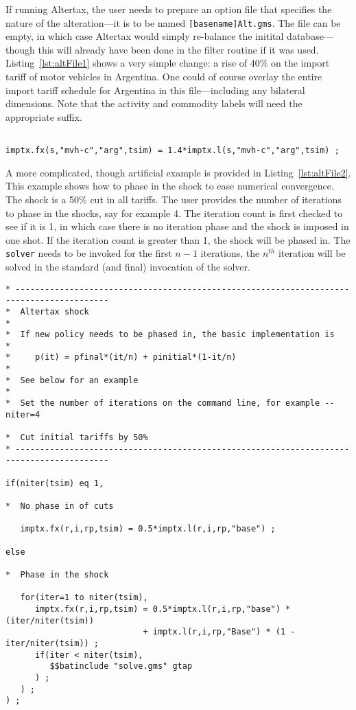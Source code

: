 If running Altertax, the user needs to prepare an option file that specifies the
nature of the alteration---it is to be named \texttt{[basename]Alt.gms}. The
file can be empty, in which case Altertax would simply re-balance the initital
database---though this will already have been done in the filter routine if it
was used. Listing~\ref{lst:altFile1} shows a very simple change: a rise of 40\%
on the import tariff of motor vehicles in Argentina. One could of course overlay
the entire import tariff schedule for Argentina in this file---including any
bilateral dimensions. Note that the activity and commodity labels will need the
appropriate suffix.

\begin{lstlisting}[language=GAMS,
   caption={An example of an Altertax shock}, label=lst:altFile1]

imptx.fx(s,"mvh-c","arg",tsim) = 1.4*imptx.l(s,"mvh-c","arg",tsim) ;

\end{lstlisting}

A more complicated, though artificial example is provided in
Listing~\ref{lst:altFile2}. This example shows how to phase in the shock to ease
numerical convergence. The shock is a 50\% cut in all tariffs. The user provides
the number of iterations to phase in the shocks, say for example 4. The
iteration count is first checked to see if it is 1, in which case there is no
iteration phase and the shock is imposed in one shot. If the iteration count is
greater than 1, the shock will be phased in. The \texttt{solver} needs to be
invoked for the first $n-1$ iterations, the $n^{\mathit{th}}$ iteration will be
solved in the standard (and final) invocation of the solver.

\begin{lstlisting}[language=GAMS,
   caption={An example of an Altertax file}, label=lst:altFile2]
* -----------------------------------------------------------------------------------------
*  Altertax shock
*
*  If new policy needs to be phased in, the basic implementation is
*
*     p(it) = pfinal*(it/n) + pinitial*(1-it/n)
*
*  See below for an example
*
*  Set the number of iterations on the command line, for example --niter=4

*  Cut initial tariffs by 50%
* -----------------------------------------------------------------------------------------

if(niter(tsim) eq 1,

*  No phase in of cuts

   imptx.fx(r,i,rp,tsim) = 0.5*imptx.l(r,i,rp,"base") ;

else

*  Phase in the shock

   for(iter=1 to niter(tsim),
      imptx.fx(r,i,rp,tsim) = 0.5*imptx.l(r,i,rp,"base") * (iter/niter(tsim))
                            + imptx.l(r,i,rp,"Base") * (1 - iter/niter(tsim)) ;
      if(iter < niter(tsim),
         $$batinclude "solve.gms" gtap
      ) ;
   ) ;
) ;
\end{lstlisting}

